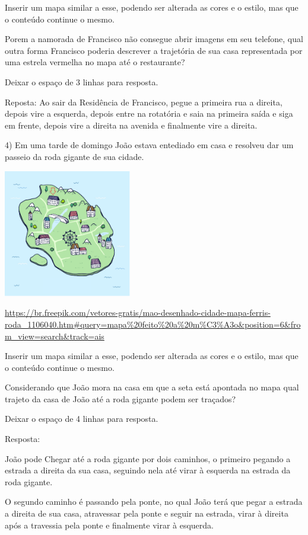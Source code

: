 {Inserir um mapa similar a esse, podendo ser alterada as cores e o
estilo, mas que o conteúdo continue o mesmo.

Porem a namorada de Francisco não consegue abrir imagens em seu
telefone, qual outra forma Francisco poderia descrever a trajetória de
sua casa representada por uma estrela vermelha no mapa até o
restaurante?

Deixar o espaço de 3 linhas para resposta.

Reposta: Ao sair da Residência de Francisco, pegue a primeira rua a
direita, depois vire a esquerda, depois entre na rotatória e saia na
primeira saída e siga em frente, depois vire a direita na avenida e
finalmente vire a direita.

4) Em uma tarde de domingo João estava entediado em casa e resolveu dar
um passeio da roda gigante de sua cidade.

\includegraphics[width=2.2in,height=2.2in]{./imgSAEB_8_MAT/media/image38.png}

\url{https://br.freepik.com/vetores-gratis/mao-desenhado-cidade-mapa-ferris-roda_1106040.htm\#query=mapa\%20feito\%20a\%20m\%C3\%A3o\&position=6\&from_view=search\&track=ais}

Inserir um mapa similar a esse, podendo ser alterada as cores e o
estilo, mas que o conteúdo continue o mesmo.

Considerando que João mora na casa em que a seta está apontada no mapa
qual trajeto da casa de João até a roda gigante podem ser traçados?

Deixar o espaço de 4 linhas para resposta.

Resposta:

João pode Chegar até a roda gigante por dois caminhos, o primeiro
pegando a estrada a direita da sua casa, seguindo nela até virar à
esquerda na estrada da roda gigante.

O segundo caminho é passando pela ponte, no qual João terá que pegar a
estrada a direita de sua casa, atravessar pela ponte e seguir na
estrada, virar à direita após a travessia pela ponte e finalmente virar
à esquerda.

}
